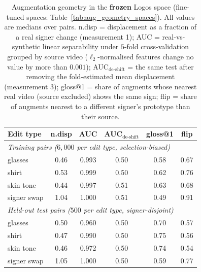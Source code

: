 \begin{table}[t]
\centering
\footnotesize
\setlength{\tabcolsep}{4pt}
\begin{tabular}{lccccc}
\toprule
\textbf{Edit type} & \textbf{n.disp} & \textbf{AUC} &
\textbf{AUC$_{\text{de-shift}}$} & \textbf{gloss@1} & \textbf{flip} \\
\midrule
\multicolumn{6}{l}{\emph{Training pairs ($6{,}000$ per edit type, selection-biased)}} \\
\;\;glasses     & 0.46 & 0.993 & 0.50 & 0.58 & 0.67 \\
\;\;shirt       & 0.53 & 0.999 & 0.50 & 0.62 & 0.76 \\
\;\;skin tone   & 0.44 & 0.997 & 0.51 & 0.63 & 0.68 \\
\;\;signer swap & 1.04 & 1.000 & 0.51 & 0.49 & 0.91 \\
\midrule
\multicolumn{6}{l}{\emph{Held-out test pairs ($500$ per edit type, signer-disjoint)}} \\
\;\;glasses     & 0.50 & 0.960 & 0.50 & 0.70 & 0.57 \\
\;\;shirt       & 0.47 & 0.990 & 0.50 & 0.75 & 0.56 \\
\;\;skin tone   & 0.46 & 0.972 & 0.50 & 0.74 & 0.54 \\
\;\;signer swap & 1.05 & 1.000 & 0.50 & 0.59 & 0.77 \\
\bottomrule
\end{tabular}
\caption{Augmentation geometry in the \textbf{frozen} Logos space
(fine-tuned spaces: Table~\ref{tab:aug_geometry_spaces}). All values are
medians over pairs. n.disp = displacement as a fraction of a real signer
change (measurement 1); AUC = real-vs-synthetic linear separability under
$5$-fold cross-validation grouped by source video ($\ell_2$-normalised
features change no value by more than $0.001$); AUC$_{\text{de-shift}}$ =
the same test after removing the fold-estimated mean displacement
(measurement 3); gloss@1 = share of augments whose nearest real video
(source excluded) shows the same sign; flip = share of augments nearest to
a different signer's prototype than their source.}
\label{tab:aug_geometry_frozen}
\end{table}

